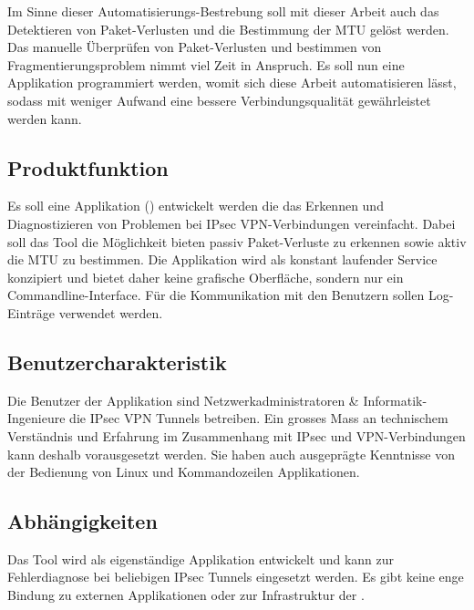 Im Sinne dieser Automatisierungs-Bestrebung soll mit dieser Arbeit auch das Detektieren von Paket-Verlusten und die Bestimmung der \ac{MTU} gelöst werden.
Das manuelle Überprüfen von Paket-Verlusten und bestimmen von Fragmentierungsproblem nimmt viel Zeit in Anspruch. Es soll nun eine Applikation programmiert werden, womit sich diese Arbeit automatisieren lässt, sodass mit weniger Aufwand eine bessere Verbindungsqualität gewährleistet werden kann.


\subsection{Produktfunktion}
Es soll eine Applikation (\tool{}) entwickelt werden die das Erkennen und Diagnostizieren von Problemen bei \ac{IPsec} \ac{VPN}-Verbindungen vereinfacht. Dabei soll das Tool die Möglichkeit bieten passiv Paket-Verluste zu erkennen sowie aktiv die \ac{MTU} zu bestimmen. Die Applikation wird als konstant laufender Service konzipiert und bietet daher keine grafische Oberfläche, sondern nur ein Commandline-Interface. Für die Kommunikation mit den Benutzern sollen Log-Einträge verwendet werden.

\subsection{Benutzercharakteristik}
Die Benutzer der Applikation sind Netzwerkadministratoren \& Informatik-Ingenieure die \ac{IPsec} \ac{VPN} Tunnels betreiben. Ein grosses Mass an technischem Verständnis und Erfahrung im Zusammenhang mit \ac{IPsec} und \ac{VPN}-Verbindungen kann deshalb vorausgesetzt werden. Sie haben auch ausgeprägte Kenntnisse von der Bedienung von Linux und Kommandozeilen Applikationen.

\subsection{Abhängigkeiten}
Das Tool wird als eigenständige Applikation entwickelt und kann zur Fehlerdiagnose bei beliebigen \ac{IPsec} Tunnels eingesetzt werden. Es gibt keine enge Bindung zu externen Applikationen oder zur Infrastruktur der \osag{}.